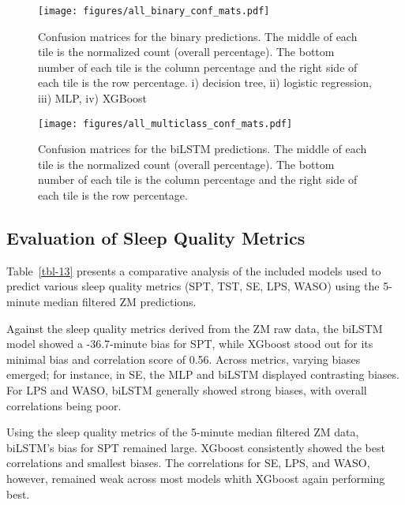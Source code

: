 \documentclass[
  10pt,
]{scrbook}
\begin{document}
\begin{figure}

{\centering \texttt{[image: figures/all\_binary\_conf\_mats.pdf]}

}

\caption{\label{fig-bin_conf_mat}Confusion matrices for the binary
predictions. The middle of each tile is the normalized count (overall
percentage). The bottom number of each tile is the column percentage and
the right side of each tile is the row percentage. i) decision tree, ii)
logistic regression, iii) MLP, iv) XGBoost}

\end{figure}

\begin{figure}

{\centering \texttt{[image: figures/all\_multiclass\_conf\_mats.pdf]}

}

\caption{\label{fig-mul_conf_mat}Confusion matrices for the biLSTM
predictions. The middle of each tile is the normalized count (overall
percentage). The bottom number of each tile is the column percentage and
the right side of each tile is the row percentage.}

\end{figure}

\hypertarget{evaluation-of-sleep-quality-metrics}{%
\subsection{Evaluation of Sleep Quality
Metrics}\label{evaluation-of-sleep-quality-metrics}}

Table~\ref{tbl-13} presents a comparative analysis of the included
models used to predict various sleep quality metrics (SPT, TST, SE, LPS,
WASO) using the 5-minute median filtered ZM predictions.

Against the sleep quality metrics derived from the ZM raw data, the
biLSTM model showed a -36.7-minute bias for SPT, while XGboost stood out
for its minimal bias and correlation score of 0.56. Across metrics,
varying biases emerged; for instance, in SE, the MLP and biLSTM
displayed contrasting biases. For LPS and WASO, biLSTM generally showed
strong biases, with overall correlations being poor.

Using the sleep quality metrics of the 5-minute median filtered ZM data,
biLSTM's bias for SPT remained large. XGboost consistently showed the
best correlations and smallest biases. The correlations for SE, LPS, and
WASO, however, remained weak across most models whith XGboost again
performing best.
\end{document}
